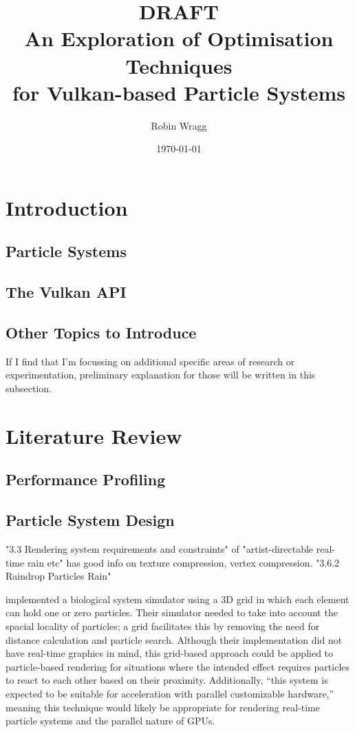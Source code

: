 \documentclass[11pt, a4paper, twocolumn]{article}
\title{\sffamily\bfseries DRAFT\\An Exploration of Optimisation Techniques\\for Vulkan-based Particle Systems}
\author{Robin Wragg}
\date{\today}
\begin{document}
\maketitle

\section{Introduction}

\subsection{Particle Systems}

\subsection{The Vulkan API}

\subsection{Other Topics to Introduce}

If I find that I'm focussing on additional specific areas of research or experimentation, preliminary explanation for those will be written in this subsection.

\section{Literature Review}

\subsection{Performance Profiling}

\subsection{Particle System Design}

\cite{Tatarchuk2006}
"3.3 Rendering system requirements and constraints" of "artist-directable real-time rain etc" has good info on texture compression, vertex compression.
"3.6.2 Raindrop Particles Rain"

\citet{Boulianne2007} implemented a biological system simulator using a 3D grid in which each element can hold one or zero particles. Their simulator needed to take into account the spacial locality of particles; a grid facilitates this by removing the need for distance calculation and particle search. Although their implementation did not have real-time graphics in mind, this grid-based approach could be applied to particle-based rendering for situations where the intended effect requires particles to react to each other based on their proximity. Additionally, ``this system is expected to be suitable for acceleration with parallel customizable hardware,'' \citep{Boulianne2007} meaning this technique would likely be appropriate for rendering real-time particle systems and the parallel nature of GPUs.
\end{document}
